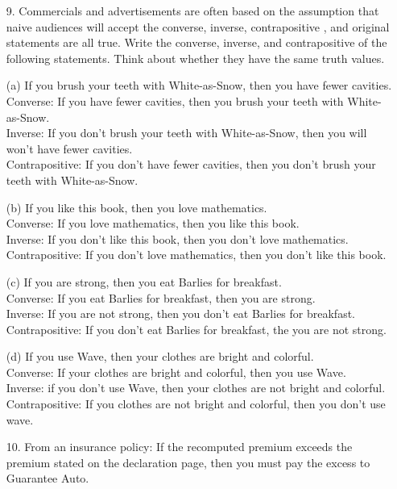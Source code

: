 \documentclass{article}
\begin{document}
\begin{itemize}
    \item[9.] Commercials and advertisements are often based on the assumption that naive audiences will accept the converse, inverse, contrapositive , and original statements are all true.  Write the converse, inverse, and contrapositive of the following statements.  Think about whether they have the same truth values.
    
    (a) If you brush your teeth with White-as-Snow, then you have fewer cavities.\\
    Converse: {\color{blue} If you have fewer cavities, then you brush your teeth with White-as-Snow.}\\
    Inverse: {\color{olive} If you don't brush your teeth with White-as-Snow, then you will won't have fewer cavities.}\\
    Contrapositive: {\color{purple} If you don't have fewer cavities, then you don't brush your teeth with White-as-Snow.}
    
    (b) If you like this book, then you love mathematics.\\
    Converse: {\color{blue} If you love mathematics, then you like this book.}\\
    Inverse: {\color{olive} If you don't like this book, then you don't love mathematics.}\\
    Contrapositive: {\color{purple} If you don't love mathematics, then you don't like this book.}
    
    (c) If you are strong, then you eat Barlies for breakfast.\\
    Converse: {\color{blue} If you eat Barlies for breakfast, then you are strong.}\\
    Inverse: {\color{olive} If you are not strong, then you don't eat Barlies for breakfast.}\\
    Contrapositive: {\color{purple} If you don't eat Barlies for breakfast, the you are not strong.}
    
    (d) If you use Wave, then your clothes are bright and colorful.\\
    Converse: {\color{blue} If your clothes are bright and colorful, then you use Wave.}\\
    Inverse: {\color{olive} if you don't use Wave, then your clothes are not bright and colorful.}\\
    Contrapositive: {\color{purple} If you clothes are not bright and colorful, then you don't use wave.}
    
    \item[10.] From an insurance policy: If the recomputed premium exceeds the premium stated on the declaration page, then you must pay the excess to Guarantee Auto.
    

\end{itemize}
\end{document}
